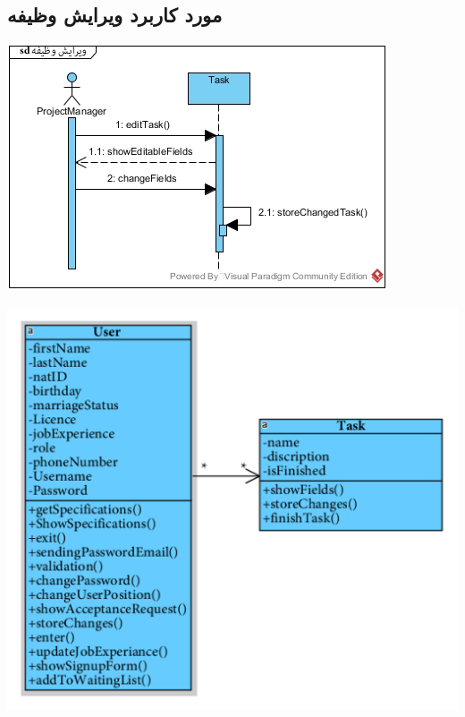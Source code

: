 \newpage
\vspace{2cm}
\subsection*{مورد کاربرد ویرایش وظیفه}
\vspace{2cm}
\begin{center}
\includegraphics[width=\textwidth]{SequenceDiagrams/19.jpg}
\end{center}

\newpage
\vspace{2cm}
\begin{center}
\includegraphics[width=\textwidth]{SequenceClasses/19.png}
\end{center}

